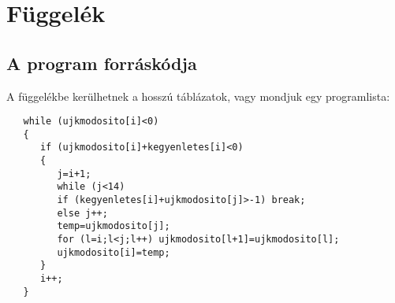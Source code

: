 \chapter{Függelék}

\section{A program forráskódja}
A függelékbe kerülhetnek a hosszú táblázatok, vagy mondjuk egy programlista:
\begin{verbatim}
   while (ujkmodosito[i]<0)
   {
      if (ujkmodosito[i]+kegyenletes[i]<0)
      {
         j=i+1;
         while (j<14)
         if (kegyenletes[i]+ujkmodosito[j]>-1) break;
         else j++;
         temp=ujkmodosito[j];
         for (l=i;l<j;l++) ujkmodosito[l+1]=ujkmodosito[l];
         ujkmodosito[i]=temp;
      }
      i++;
   }
\end{verbatim}